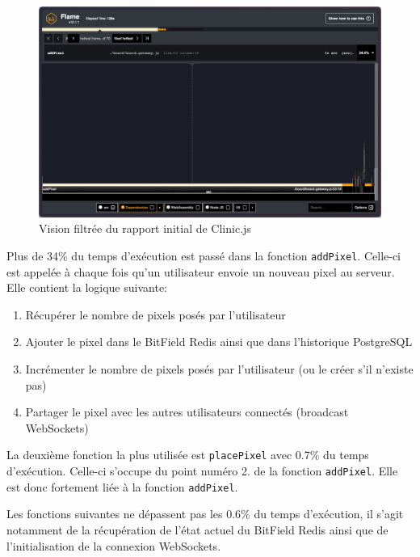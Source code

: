 \begin{figure}[H]
  \centering
  \includegraphics[width=1\textwidth]{./assets/figures/flame/flame1-filtered.png}
  \caption{Vision filtrée du rapport initial de Clinic.js}
  \label{fig:flame1-filtered}
\end{figure}

Plus de 34\% du temps d'exécution est passé dans la fonction \texttt{addPixel}. Celle-ci est appelée à chaque fois qu'un utilisateur envoie un nouveau pixel au serveur. Elle contient la logique suivante:

\begin{enumerate}
  \item Récupérer le nombre de pixels posés par l'utilisateur
  \item Ajouter le pixel dans le BitField Redis ainsi que dans l'historique PostgreSQL
  \item Incrémenter le nombre de pixels posés par l'utilisateur (ou le créer s'il n'existe pas)
  \item Partager le pixel avec les autres utilisateurs connectés (broadcast WebSockets)
\end{enumerate}

La deuxième fonction la plus utilisée est \texttt{placePixel} avec 0.7\% du temps d'exécution. Celle-ci s'occupe du point numéro 2. de la fonction \texttt{addPixel}. Elle est donc fortement liée à la fonction \texttt{addPixel}.

Les fonctions suivantes ne dépassent pas les 0.6\% du temps d'exécution, il s'agit notamment de la récupération de l'état actuel du BitField Redis ainsi que de l'initialisation de la connexion WebSockets.

